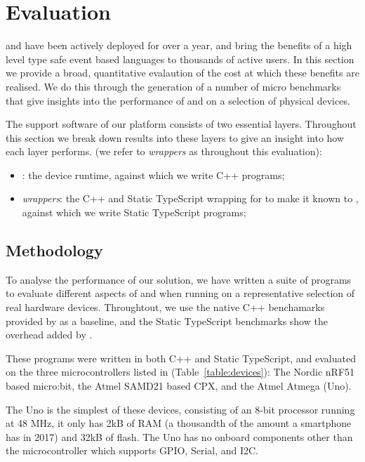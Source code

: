 \section{Evaluation}
\label{sec:evaluate}

\MC and \CO have been actively deployed for over a year, and bring the benefits of a 
high level type safe event based languages to thousands of active users. 
In this section we provide a broad, quantitative evalaution of the cost at which 
these benefits are realised. We do this through the generation of a number of micro 
benchmarks that give insights into the performance of \MC and \CO on a selection of 
physical devices. 

The support software of our platform consists of two essential layers. Throughout this
section we break down results into these layers to give an insight into how each layer performs.
(we refer to \emph{\MC wrappers} as \MC throughout this evaluation):

\begin{itemize}
\item \emph{\CO}: the device runtime, against which we write C++ programs;
\item \emph{\MC wrappers}: the C++ and Static TypeScript wrapping for \CO
to make it known to \MC, against which we write Static TypeScript programs;
\end{itemize}

\subsection{Methodology}

To analyse the performance of our solution, we have written a suite of programs to evaluate 
different aspects of \MC and \CO when running on a representative selection of real hardware devices. 
Throughtout, we use the native C++ benchamarks provided by \CO as a baseline, and the Static TypeScript benchmarks show the overhead
added by \MC. 

These programs were written in both C++ and Static TypeScript, and evaluated on the three microcontrollers 
listed in (Table~\ref{table:devices}): The Nordic nRF51 based micro:bit, the Atmel SAMD21 based CPX, and the Atmel Atmega (Uno). 

The Uno is the simplest of these devices, consisting of an 8-bit processor running at 48 MHz, it only has 2kB of RAM (a thousandth of the 
amount a smartphone has in 2017) and 32kB of flash. The Uno has no onboard components other than the microcontroller which supports 
GPIO, Serial, and I2C.

